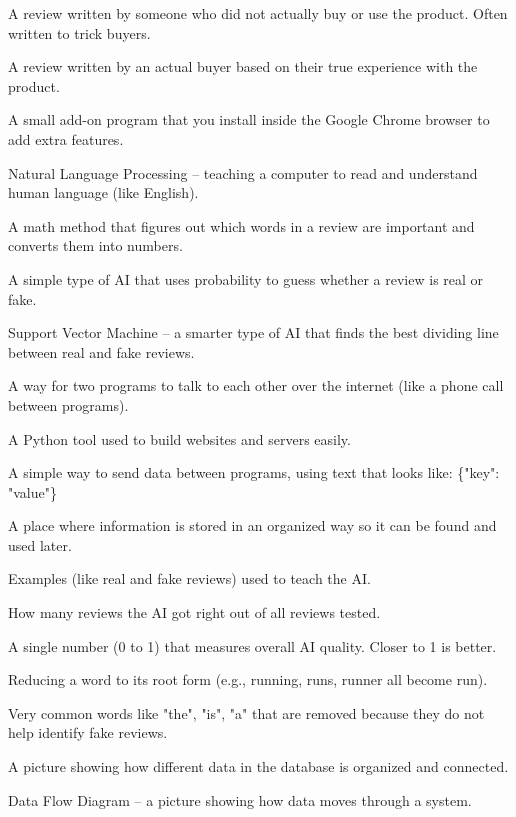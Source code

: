 \documentclass[10pt, a4paper]{report}
\begin{document}
\begin{description}[leftmargin=3cm]
  \item[Fake Review] A review written by someone who did not actually buy or use the product. Often written to trick buyers.
  \item[Real/Genuine Review] A review written by an actual buyer based on their true experience with the product.
  \item[Chrome Extension] A small add-on program that you install inside the Google Chrome browser to add extra features.
  \item[NLP] Natural Language Processing -- teaching a computer to read and understand human language (like English).
  \item[TF-IDF] A math method that figures out which words in a review are important and converts them into numbers.
  \item[Naive Bayes] A simple type of AI that uses probability to guess whether a review is real or fake.
  \item[SVM] Support Vector Machine -- a smarter type of AI that finds the best dividing line between real and fake reviews.
  \item[API] A way for two programs to talk to each other over the internet (like a phone call between programs).
  \item[Flask] A Python tool used to build websites and servers easily.
  \item[JSON] A simple way to send data between programs, using text that looks like: \{"key": "value"\}
  \item[Database] A place where information is stored in an organized way so it can be found and used later.
  \item[Training Data] Examples (like real and fake reviews) used to teach the AI.
  \item[Accuracy] How many reviews the AI got right out of all reviews tested.
  \item[F1 Score] A single number (0 to 1) that measures overall AI quality. Closer to 1 is better.
  \item[Stemming] Reducing a word to its root form (e.g., running, runs, runner all become run).
  \item[Stop Words] Very common words like "the", "is", "a" that are removed because they do not help identify fake reviews.
  \item[ER Diagram] A picture showing how different data in the database is organized and connected.
  \item[DFD] Data Flow Diagram -- a picture showing how data moves through a system.

\end{description}
\end{document}
